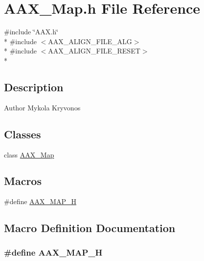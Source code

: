 \hypertarget{a00266}{}\section{A\+A\+X\+\_\+\+Map.\+h File Reference}
\label{a00266}
{\ttfamily \#include \char`\"{}A\+A\+X.\+h\char`\"{}}\\*
{\ttfamily \#include $<$A\+A\+X\+\_\+\+A\+L\+I\+G\+N\+\_\+\+F\+I\+L\+E\+\_\+\+A\+L\+G$>$}\\*
{\ttfamily \#include $<$A\+A\+X\+\_\+\+A\+L\+I\+G\+N\+\_\+\+F\+I\+L\+E\+\_\+\+R\+E\+S\+E\+T$>$}\\*


\subsection{Description}
\begin{DoxyAuthor}{Author}
Mykola Kryvonos 
\end{DoxyAuthor}
\subsection*{Classes}
\begin{DoxyCompactItemize}
\item 
class \hyperlink{a00118}{A\+A\+X\+\_\+\+Map}
\end{DoxyCompactItemize}
\subsection*{Macros}
\begin{DoxyCompactItemize}
\item 
\#define \hyperlink{a00266_a3537bee52a550093f02a1880d4e314d1}{A\+A\+X\+\_\+\+M\+A\+P\+\_\+\+H}
\end{DoxyCompactItemize}


\subsection{Macro Definition Documentation}
\hypertarget{a00266_a3537bee52a550093f02a1880d4e314d1}{}
\subsubsection[{A\+A\+X\+\_\+\+M\+A\+P\+\_\+\+H}]{\setlength{\rightskip}{0pt plus 5cm}\#define A\+A\+X\+\_\+\+M\+A\+P\+\_\+\+H}\label{a00266_a3537bee52a550093f02a1880d4e314d1}
